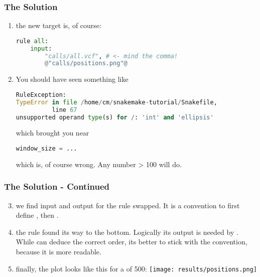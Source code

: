 \begin{frame}[fragile]
	\frametitle{The Solution}
	\begin{enumerate}[<+->]
		\item the new target is, of course:
		\begin{lstlisting}[language=Python,style=Python]
rule all:
    input:
        "calls/all.vcf", # <- mind the comma!
        @"calls/positions.png"@
	    \end{lstlisting}
        \item You should have seen something like
        \begin{lstlisting}[language=Python,style=Python, basicstyle=\footnotesize]
RuleException:
TypeError in file /home/cm/snakemake-tutorial/Snakefile, 
          line 67
unsupported operand type(s) for /: 'int' and 'ellipsis'
        \end{lstlisting}
        which brought you near
        \begin{lstlisting}[language=Python,style=Python]
    window_size = ...
        \end{lstlisting}
        which is, of course wrong. Any number > 100 will do.
    \end{enumerate}
\end{frame}

\begin{frame}[fragile]
	\frametitle{The Solution - Continued}
	\begin{enumerate}[<+->]
		\setcounter{enumi}{2}
		\item we find input and output for the  rule swapped. It is a convention to first define , then .
		\item the rule  found its way to the bottom. Logically its output is needed by . While \Snakemake can deduce the correct order, its better to stick with the convention, because it is more readable.
		\item finally, the plot looks like this for a  of 500:
		\texttt{[image: results/positions.png]}
		
	\end{enumerate}
\end{frame}

